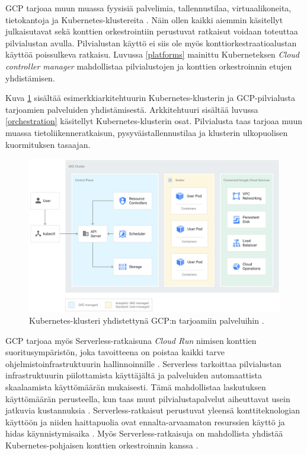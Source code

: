 GCP tarjoaa muun muassa fyysisiä palvelimia, tallennustilaa, virtuaalikoneita, tietokantoja ja Kubernetes-klustereita \cite{Products23}.
Näin ollen kaikki aiemmin käsitellyt julkaisutavat sekä konttien orkestrointiin perustuvat ratkaisut voidaan toteuttaa pilvialustan avulla.
Pilvialustan käyttö ei siis ole myös konttiorkestraatioalustan käyttöä poissulkeva ratkaisu.
Luvussa \ref{platforms} mainittu Kuberneteksen \textit{Cloud controller manager} mahdollistaa pilvialustojen ja konttien orkestroinnin etujen yhdistämisen.

Kuva \ref{fig:architecture} sisältää esimerkkiarkitehtuurin Kubernetes-klusterin ja GCP-pilvialusta tarjoamien palveluiden yhdistämisestä.
Arkkitehtuuri sisältää luvussa \ref{orchestration} käsitellyt Kubernetes-klusterin osat.
Pilvialusta taas tarjoaa muun muassa tietoliikenneratkaisun, pysyväistallennustilaa ja klusterin ulkopuolisen kuormituksen tasaajan.


\begin{figure}[ht]
\begin{center}
\includegraphics[width=1\textwidth]{figures/gke_architecture.png}
\caption{Kubernetes-klusteri yhdistettynä GCP:n tarjoamiin palveluihin \cite{cluster23}\label{fig:architecture}.}
\end{center}
\end{figure}

GCP tarjoaa myös Serverless-ratkaisuna \textit{Cloud Run} nimisen konttien suoritusympäristön, joka tavoitteena on poistaa kaikki tarve ohjelmistoinfrastruktuurin hallinnoinnille \cite{Products23}.
Serverless tarkoittaa pilvialustan infrastruktuurin piilottamista käyttäjältä ja palveluiden automaattista skaalaamista käyttömäärän mukaisesti.
Tämä mahdollistaa laskutuksen käyttömäärän perusteella, kun taas muut pilvialustapalvelut aiheuttavat usein jatkuvia kustannuksia \cite{shafiei22}.
Serverless-ratkaisut perustuvat yleensä konttiteknologian käyttöön ja niiden haittapuolia ovat ennalta-arvaamaton resurssien käyttö ja hidas käynnistymisaika \cite{shafiei22, mondal22}.
Myös Serverless-ratkaisuja on mahdollista yhdistää Kubernetes-pohjaisen konttien orkestroinnin kanssa \cite{mondal22}. 

